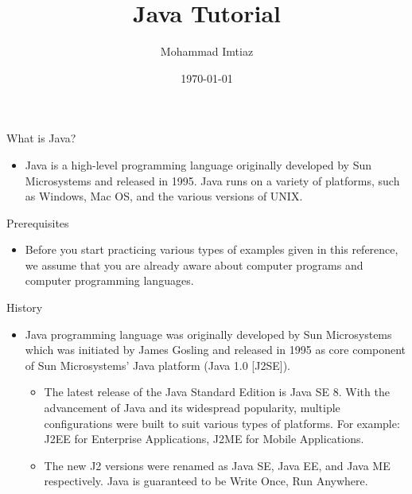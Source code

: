 \documentclass{beamer}
\title[Java Tutorial  \Talentio]{Java Tutorial}
\author{Mohammad Imtiaz}
\institute{}
\date{\today}
\begin{document}
\begin{frame}
  \titlepage
\end{frame}

\begin{frame}{What is Java?}
 \begin{itemize}
 \item Java is a high-level programming language originally developed by Sun Microsystems and released in 1995. Java runs on a variety of platforms, such as Windows, Mac OS, and the various versions of UNIX. 
 \end{itemize}
\end{frame}

\begin{frame}{Prerequisites}
	\begin{itemize}
	\item 	Before you start practicing various types of examples given in this reference, we assume that you are already aware about computer programs and computer programming languages.

	\end{itemize}
\end{frame}


\begin{frame}{History}
	\begin{itemize}
	\item 	Java programming language was originally developed by Sun Microsystems which was initiated by James Gosling and released in 1995 as core component of Sun Microsystems' Java platform (Java 1.0 [J2SE]).
	
\begin{itemize}
\item The latest release of the Java Standard Edition is Java SE 8. With the advancement of Java and its widespread popularity, multiple configurations were built to suit various types of platforms. For example: J2EE for Enterprise Applications, J2ME for Mobile Applications.
\item The new J2 versions were renamed as Java SE, Java EE, and Java ME respectively. Java is guaranteed to be Write Once, Run Anywhere.

\end{itemize}
	\end{itemize}
\end{frame}

\end{document}
